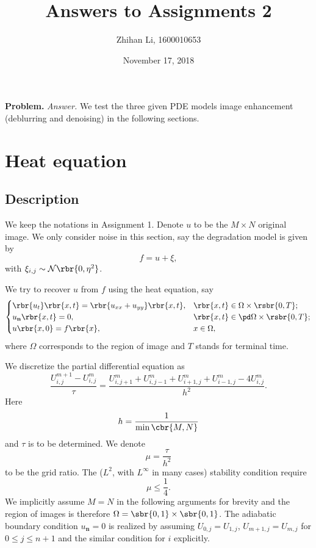 \documentclass[english, nochinese]{pnote}
\title{Answers to Assignments 2}
\author{Zhihan Li, 1600010653}
\date{November 17, 2018}
\begin{document}
\maketitle

\textbf{Problem.} \textit{Answer.} We test the three given PDE models image enhancement
(deblurring and denoising) in the following sections. 

\section{Heat equation}

\subsection{Description}

We keep the notations in Assignment 1. Denote $u$ to be the $ M \times N $ original image. We only consider noise in this section, say the degradation model is given by
\begin{equation}
f = u + \xi,
\end{equation}
with $ \xi_{ i, j } \sim \mathcal{N} \rbr{ 0, \eta^2 } $.

We try to recover $u$ from $f$ using the heat equation, say
\begin{equation}
\begin{cases}
\rbr{u_t} \rbr{ x, t } = \rbr{ u_{ x x } + u_{ y y } } \rbr{ x, t }, & \rbr{ x, t } \in \Omega \times \rsbr{ 0, T }; \\
u_{\mathbf{n}} \rbr{ x, t } = 0, & \rbr{ x, t } \in \pd \Omega \times \rsbr{ 0, T }; \\
u \rbr{ x, 0 } = f \rbr{x}, & x \in \Omega,
\end{cases}
\end{equation}
where $\Omega$ corresponds to the region of image and $T$ stands for terminal time.

We discretize the partial differential equation as
\begin{equation} \label{Eq:DisHeat}
\frac{ U_{ i, j }^{ m + 1 } - U_{ i, j }^m }{\tau} = \frac{ U_{ i, j + 1 }^m + U_{ i, j - 1 }^m + U_{ i + 1, j }^m + U_{ i - 1, j }^m - 4 U_{ i, j }^m }{h^2}.
\end{equation}
Here 
\begin{equation}
h = \frac{1}{ \min \cbr{ M, N } }
\end{equation}
and $\tau$ is to be determined. We denote
\begin{equation}
\mu = \frac{\tau}{h^2}
\end{equation}
to be the grid ratio. The ($L^2$, with $L^{\infty}$ in many cases) stability condition require
\begin{equation}
\mu \le \frac{1}{4}.
\end{equation}
We implicitly assume $ M = N $ in the following arguments for brevity and the region of images is therefore $ \Omega = \sbr{ 0, 1 } \times \sbr{ 0, 1 } $. The adiabatic boundary condition $ u_{\mathbf{n}} = 0 $ is realized by assuming $ U_{ 0, j } = U_{ 1, j } $, $ U_{ m + 1, j } = U_{ m, j } $ for $ 0 \le j \le n + 1 $ and the similar condition for $i$ explicitly.
\end{document}
